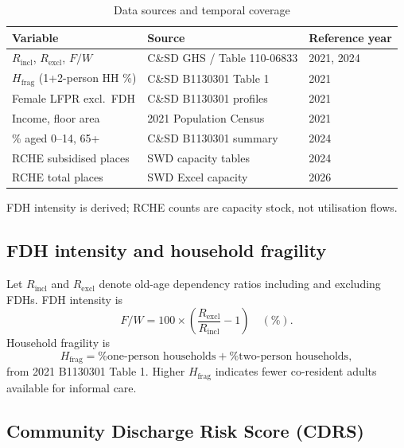\documentclass[11pt,a4paper]{article}
\begin{document}
\begin{table}[H]
\centering
\caption{Data sources and temporal coverage}
\label{tab:sources}
\begin{threeparttable}
\begin{tabular}{@{}lll@{}}
\toprule
Variable & Source & Reference year \\
\midrule
$R_{\mathrm{incl}}$, $R_{\mathrm{excl}}$, $F/W$ & C\&SD GHS / Table 110-06833 & 2021, 2024 \\
$H_{\mathrm{frag}}$ (1+2-person HH \%) & C\&SD B1130301 Table 1 & 2021 \\
Female LFPR excl.\ FDH & C\&SD B1130301 profiles & 2021 \\
Income, floor area & 2021 Population Census & 2021 \\
\% aged 0--14, 65+ & C\&SD B1130301 summary & 2024 \\
RCHE subsidised places & SWD capacity tables & 2024 \\
RCHE total places & SWD Excel capacity & 2026 \\
\bottomrule
\end{tabular}
\begin{tablenotes}\footnotesize
\item FDH intensity is derived; RCHE counts are capacity stock, not utilisation flows.
\end{tablenotes}
\end{threeparttable}
\end{table}

\subsection{FDH intensity and household fragility}

Let $R_{\mathrm{incl}}$ and $R_{\mathrm{excl}}$ denote old-age dependency ratios including and excluding FDHs. FDH intensity is
\begin{equation}
  F/W = 100 \times \left(\frac{R_{\mathrm{excl}}}{R_{\mathrm{incl}}} - 1\right) \quad (\%).
\end{equation}
Household fragility is
\begin{equation}
  H_{\mathrm{frag}} = \text{\% one-person households} + \text{\% two-person households},
\end{equation}
from 2021 B1130301 Table 1. Higher $H_{\mathrm{frag}}$ indicates fewer co-resident adults available for informal care.

\subsection{Community Discharge Risk Score (CDRS)}
\end{document}
